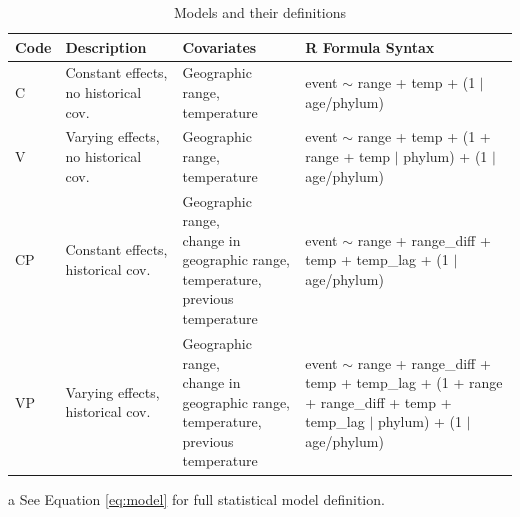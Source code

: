 \documentclass[12pt,letterpaper]{article}
\begin{document}
\begin{table}[ht]
  \caption{Models and their definitions}
  \begin{threeparttable}
    {
      \def\arraystretch{1.5}
      \begin{tabular}{ l p{3cm} l l }
        Code & Description & Covariates & R Formula Syntax\tnote{a}\phantom{\textsuperscript{a}} \\
        \hline
        C & Constant effects, no historical cov. & \parbox[t]{0.25\textwidth}{Geographic range,\\temperature} & \parbox[t]{0.33\textwidth}{event $\sim$ range + temp +\\(1 $|$ age/phylum)} \\
        V & Varying effects, no historical cov. & \parbox[t]{0.25\textwidth}{Geographic range,\\temperature} & \parbox[t]{0.33\textwidth}{event $\sim$ range + temp +\\(1 + range + temp $|$ phylum) + (1 $|$ age/phylum)} \\ 
        CP & Constant effects, historical cov. & \parbox[t]{0.25\textwidth}{Geographic range,\\change in geographic range, temperature,\\previous temperature} & \parbox[t]{0.33\textwidth}{event $\sim$ range + range\_diff +\\temp + temp\_lag +\\(1 $|$ age/phylum)} \\
        VP & Varying effects, historical cov. & \parbox[t]{0.25\textwidth}{Geographic range,\\change in geographic range, temperature,\\previous temperature} & \parbox[t]{0.33\textwidth}{event $\sim$ range + range\_diff +\\temp + temp\_lag +\\(1 + range + range\_diff +\\temp + temp\_lag $|$ phylum) +\\(1 $|$ age/phylum)} \\
        \hline
      \end{tabular}
    }
    \begin{tablenotes}
    \item[a] See Equation \ref{eq:model} for full statistical model definition.

\end{tablenotes}
\end{threeparttable}
\end{table}
\end{document}
